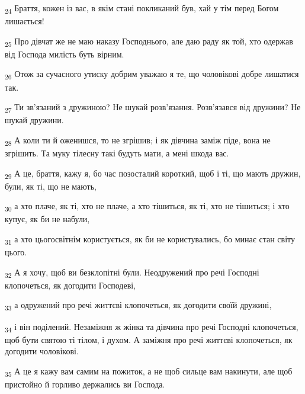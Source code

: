 \begin{tcolorbox}
\textsubscript{24} Браття, кожен із вас, в якім стані покликаний був, хай у тім перед Богом лишається!
\end{tcolorbox}
\begin{tcolorbox}
\textsubscript{25} Про дівчат же не маю наказу Господнього, але даю раду як той, хто одержав від Господа милість буть вірним.
\end{tcolorbox}
\begin{tcolorbox}
\textsubscript{26} Отож за сучасного утиску добрим уважаю я те, що чоловікові добре лишатися так.
\end{tcolorbox}
\begin{tcolorbox}
\textsubscript{27} Ти зв'язаний з дружиною? Не шукай розв'язання. Розв'язався від дружини? Не шукай дружини.
\end{tcolorbox}
\begin{tcolorbox}
\textsubscript{28} А коли ти й оженишся, то не згрішив; і як дівчина заміж піде, вона не згрішить. Та муку тілесну такі будуть мати, а мені шкода вас.
\end{tcolorbox}
\begin{tcolorbox}
\textsubscript{29} А це, браття, кажу я, бо час позосталий короткий, щоб і ті, що мають дружин, були, як ті, що не мають,
\end{tcolorbox}
\begin{tcolorbox}
\textsubscript{30} а хто плаче, як ті, хто не плаче, а хто тішиться, як ті, хто не тішиться; і хто купує, як би не набули,
\end{tcolorbox}
\begin{tcolorbox}
\textsubscript{31} а хто цьогосвітнім користується, як би не користувались, бо минає стан світу цього.
\end{tcolorbox}
\begin{tcolorbox}
\textsubscript{32} А я хочу, щоб ви безклопітні були. Неодружений про речі Господні клопочеться, як догодити Господеві,
\end{tcolorbox}
\begin{tcolorbox}
\textsubscript{33} а одружений про речі життєві клопочеться, як догодити своїй дружині,
\end{tcolorbox}
\begin{tcolorbox}
\textsubscript{34} і він поділений. Незаміжня ж жінка та дівчина про речі Господні клопочеться, щоб бути святою ті тілом, і духом. А заміжня про речі життєві клопочеться, як догодити чоловікові.
\end{tcolorbox}
\begin{tcolorbox}
\textsubscript{35} А це я кажу вам самим на пожиток, а не щоб сильце вам накинути, але щоб пристойно й горливо держались ви Господа.
\end{tcolorbox}
